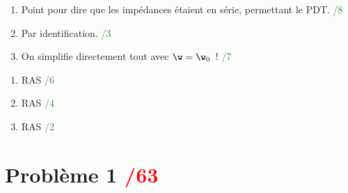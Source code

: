 \documentclass[a4paper, 10pt, final, garamond]{book}
\begin{document}
\begin{minipage}{0.68\linewidth}
    \begin{enumerate}
        \item Point pour dire que les impédances étaient en série, permettant le
            PDT. \hfill \textcolor{ForestGreen}{/8}
        \item Par identification. \hfill \textcolor{ForestGreen}{/3}
        \item On simplifie directement tout avec $\w = \w_0$~! \hfill
            \textcolor{ForestGreen}{/7}
    \end{enumerate}
\end{minipage}
\hfill
\begin{minipage}{0.20\linewidth}
    \begin{enumerate}[start=4]
        \item RAS \hfill \textcolor{ForestGreen}{/6}
        \item RAS \hfill \textcolor{ForestGreen}{/4}
        \item RAS \hfill \textcolor{ForestGreen}{/2}
    \end{enumerate}
\end{minipage}


\section{Problème 1 \hfill \textcolor{red}{/63}}
\end{document}
